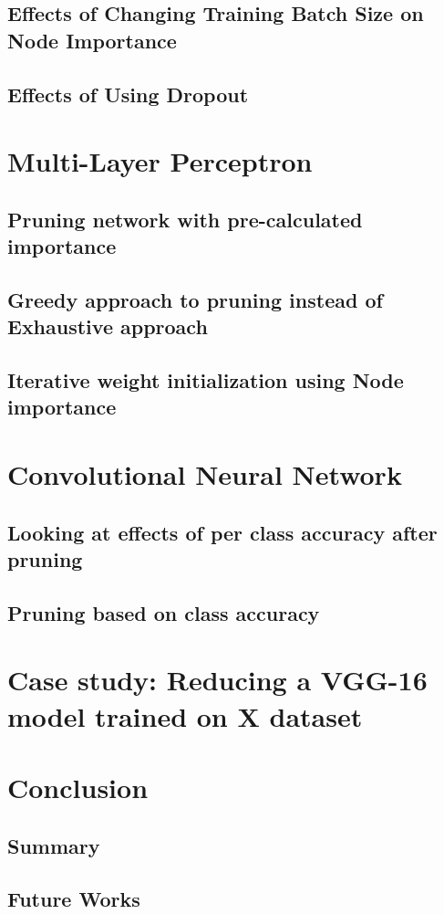 \documentclass[UKenglish]{ifimaster}
\begin{document}
    \section{Effects of Changing Training Batch Size on Node Importance}


    \section{Effects of Using Dropout}


\chapter{Multi-Layer Perceptron}
    \section{Pruning network with pre-calculated importance}


    \section{Greedy approach to pruning instead of Exhaustive approach}


    \section{Iterative weight initialization using Node importance}



\chapter{Convolutional Neural Network}
    \section{Looking at effects of per class accuracy after pruning}


    \section{Pruning based on class accuracy}


\chapter{Case study: Reducing a VGG-16 model trained on X dataset}

\chapter{Conclusion}
    \section{Summary}


    \section{Future Works}


\backmatter{}
\printbibliography
\end{document}
